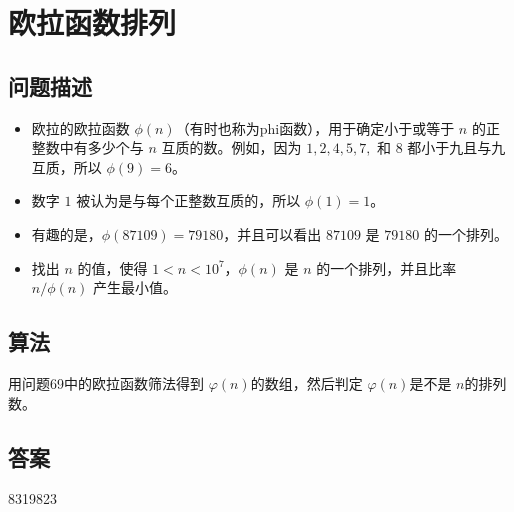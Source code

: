 \section{欧拉函数排列}\label{sec:problem70}
\subsection{问题描述}
\begin{tcolorbox}
\begin{itemize}
    \item 欧拉的欧拉函数 \(\phi(n)\)（有时也称为phi函数），用于确定小于或等于 \(n\) 的正整数中有多少个与 \(n\) 互质的数。例如，因为 \(1, 2, 4, 5, 7,\) 和 \(8\) 都小于九且与九互质，所以 \(\phi(9) = 6\)。
    \item 数字 \(1\) 被认为是与每个正整数互质的，所以 \(\phi(1) = 1\)。
    \item 有趣的是，\(\phi(87109) = 79180\)，并且可以看出 \(87109\) 是 \(79180\) 的一个排列。
    \item 找出 \(n\) 的值，使得 \(1 < n < 10^7\)，\(\phi(n)\) 是 \(n\) 的一个排列，并且比率 \(n / \phi(n)\) 产生最小值。
\end{itemize}
\end{tcolorbox}

\subsection{算法}
用问题69中的欧拉函数筛法得到 \( \varphi(n) \)的数组，然后判定 \( \varphi(n) \)是不是 \( n \)的排列数。

\subsection{答案}
8319823

